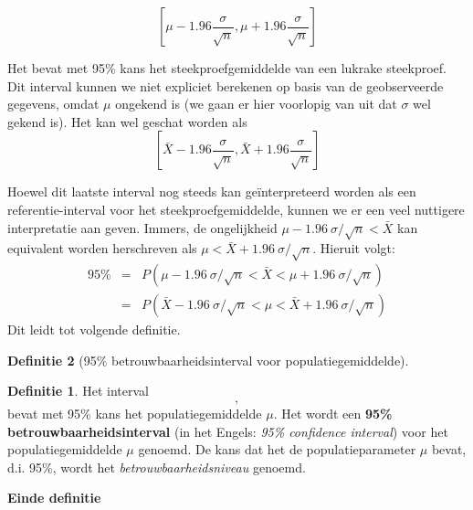 \documentclass[
  12pt,dutch,coursenotes]{book}
\theoremstyle{definition}
\newtheorem{definition}{Definitie}[chapter]
\theoremstyle{definition}
\theoremstyle{definition}
\theoremstyle{remark}
\begin{document}
\begin{equation*}
\left[\mu - 1.96 \frac{\sigma}{\sqrt{n}},\mu + 1.96 \frac{\sigma}{\sqrt{n}}%
\right]
\end{equation*}

Het bevat met 95\% kans het steekproefgemiddelde van een lukrake
steekproef. Dit interval kunnen we niet expliciet berekenen op basis van de
geobserveerde gegevens, omdat \(\mu\) ongekend is (we gaan er hier voorlopig
van uit dat \(\sigma\) wel gekend is). Het kan wel geschat worden als
\begin{equation*}
\left[\bar X - 1.96 \frac{\sigma}{\sqrt{n}},\bar X + 1.96 \frac{\sigma}{\sqrt{n}}\right]
\end{equation*}

Hoewel dit laatste interval nog steeds kan geïnterpreteerd worden als
een referentie-interval voor het steekproefgemiddelde, kunnen we er een veel
nuttigere interpretatie aan geven. Immers, de ongelijkheid \(\mu - 1.96 \
\sigma/\sqrt{n} < \bar{X}\) kan equivalent worden herschreven als \(\mu < \bar{X} + 1.96 \ \sigma/\sqrt{n}\). Hieruit volgt:
\begin{eqnarray*}
95\% &=& P( \mu - 1.96 \ \sigma/\sqrt{n} < \bar{X} < \mu + 1.96 \ \sigma/\sqrt{n} ) \\
&=&P( \bar{X} - 1.96 \ \sigma/\sqrt{n} < \mu < \bar{X} + 1.96 \ \sigma/\sqrt{n} )
\end{eqnarray*}
Dit leidt tot volgende definitie.

\begin{definition}[95$\%$ betrouwbaarheidsinterval voor populatiegemiddelde]
\begin{definition}

\protect\hypertarget{def:unnamed-chunk-144}{}{\label{def:unnamed-chunk-144} \iffalse (95\(\%\) betrouwbaarheidsinterval voor populatiegemiddelde) \fi{} }Het interval
\begin{equation}  
[\bar{X} - 1.96 \ \sigma/\sqrt{n} , \bar{X} + 1.96 \ \sigma/\sqrt{n} ], \label{eq:bi}
\end{equation}
bevat met 95\% kans het populatiegemiddelde \(\mu\). Het wordt een \textbf{95\% betrouwbaarheidsinterval} (in het Engels: \emph{95\% confidence interval}) voor het populatiegemiddelde \(\mu\) genoemd. De kans dat het de populatieparameter \(\mu\)
bevat, d.i. 95\%, wordt het \emph{betrouwbaarheidsniveau} genoemd.

\textbf{Einde definitie}

\end{definition}
\end{definition}
\end{document}
